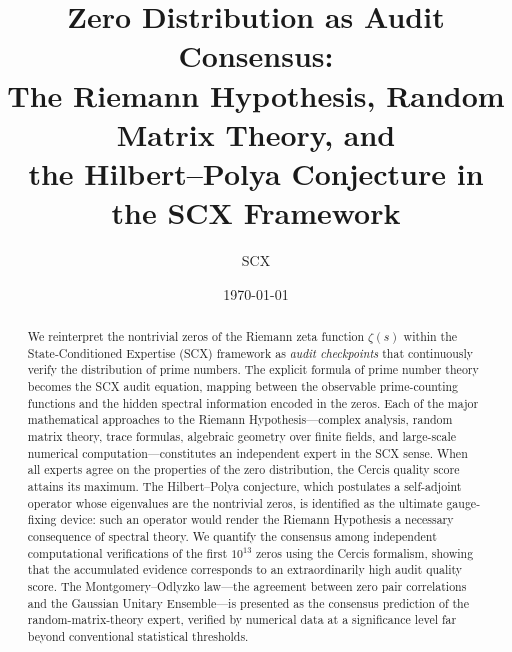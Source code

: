 \documentclass[12pt,a4paper]{article}
\title{\textbf{Zero Distribution as Audit Consensus:\\
The Riemann Hypothesis, Random Matrix Theory, and\\
the Hilbert--Polya Conjecture in the SCX Framework}}
\author{SCX}
\date{\today}
\theoremstyle{remark}
\begin{document}
\maketitle
\begin{abstract}
We reinterpret the nontrivial zeros of the Riemann zeta function $\zeta(s)$ within
the State-Conditioned Expertise (SCX) framework as \emph{audit checkpoints}
that continuously verify the distribution of prime numbers.
The explicit formula of prime number theory becomes the SCX audit equation,
mapping between the observable prime-counting functions and the hidden spectral
information encoded in the zeros. Each of the major mathematical approaches
to the Riemann Hypothesis---complex analysis, random matrix theory, trace
formulas, algebraic geometry over finite fields, and large-scale numerical
computation---constitutes an independent expert in the SCX sense. When all
experts agree on the properties of the zero distribution, the Cercis quality
score attains its maximum. The Hilbert--Polya conjecture, which postulates
a self-adjoint operator whose eigenvalues are the nontrivial zeros, is
identified as the ultimate gauge-fixing device: such an operator would render
the Riemann Hypothesis a necessary consequence of spectral theory. We quantify
the consensus among independent computational verifications of the first
$10^{13}$ zeros using the Cercis formalism, showing that the accumulated
evidence corresponds to an extraordinarily high audit quality score. The
Montgomery--Odlyzko law---the agreement between zero pair correlations and
the Gaussian Unitary Ensemble---is presented as the consensus prediction of
the random-matrix-theory expert, verified by numerical data at a significance
level far beyond conventional statistical thresholds.
\end{abstract}
\tableofcontents
\end{document}
